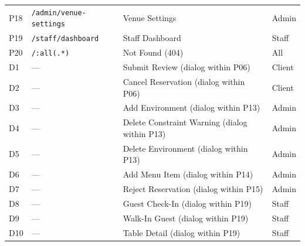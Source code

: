 \documentclass[12pt,a4paper]{article}
\begin{document}
{\begin{tabular}{@{}l l p{6cm} l@{}}
P18&\texttt{/admin/venue-settings}&Venue Settings&Admin\\
P19&\texttt{/staff/dashboard}&Staff Dashboard&Staff\\
P20&\texttt{/:all(.*)}&Not Found (404)&All\\\midrule
D1&---&Submit Review (dialog within P06)&Client\\
D2&---&Cancel Reservation (dialog within P06)&Client\\
D3&---&Add Environment (dialog within P13)&Admin\\
D4&---&Delete Constraint Warning (dialog within P13)&Admin\\
D5&---&Delete Environment (dialog within P13)&Admin\\
D6&---&Add Menu Item (dialog within P14)&Admin\\
D7&---&Reject Reservation (dialog within P15)&Admin\\
D8&---&Guest Check-In (dialog within P19)&Staff\\
D9&---&Walk-In Guest (dialog within P19)&Staff\\
D10&---&Table Detail (dialog within P19)&Staff\\
\bottomrule\end{tabular}}
\end{document}
